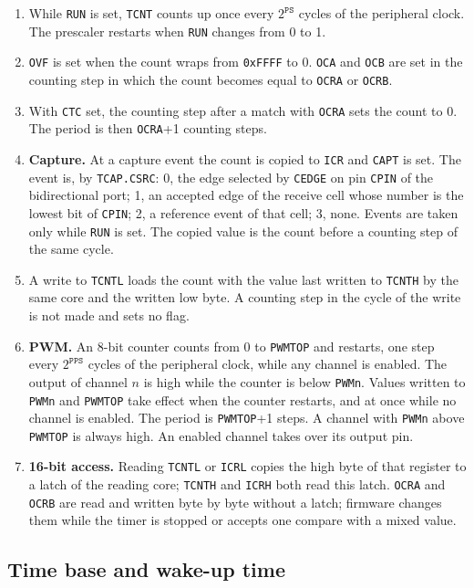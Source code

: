\documentclass[10pt,a4paper]{article}
\newcommand{\reg}[1]{\texttt{#1}}
\begin{document}
\begin{enumerate}[label=\textbf{B\arabic*},leftmargin=2.6em]
\item While \reg{RUN} is set, \reg{TCNT} counts up once every $2^{\mathtt{PS}}$ cycles of the peripheral clock. The
prescaler restarts when \reg{RUN} changes from 0 to 1.
\item \reg{OVF} is set when the count wraps from \texttt{0xFFFF} to 0. \reg{OCA} and \reg{OCB} are set in the
counting step in which the count becomes equal to \reg{OCRA} or \reg{OCRB}.
\item With \reg{CTC} set, the counting step after a match with \reg{OCRA} sets the count to 0. The period is then
\reg{OCRA}+1 counting steps.
\item \textbf{Capture.} At a capture event the count is copied to \reg{ICR} and \reg{CAPT} is set. The event is,
by \reg{TCAP.CSRC}: 0, the edge selected by \reg{CEDGE} on pin \reg{CPIN} of the bidirectional port; 1, an
accepted edge of the receive cell whose number is the lowest bit of \reg{CPIN}; 2, a reference event of that cell; 3, none.
Events are taken only while \reg{RUN} is set. The copied value is the count before a counting step of the same cycle.
\item A write to \reg{TCNTL} loads the count with the value last written to \reg{TCNTH} by the same core and the written low byte. A counting step in the cycle of the write is not made and sets no flag.
\item \textbf{PWM.} An 8-bit counter counts from 0 to \reg{PWMTOP} and restarts, one step every
$2^{\mathtt{PPS}}$ cycles of the peripheral clock, while any channel is enabled. The output of channel $n$ is
high while the counter is below \reg{PWMn}. Values written to \reg{PWMn} and \reg{PWMTOP} take effect when the
counter restarts, and at once while no channel is enabled. The period is \reg{PWMTOP}+1 steps. A channel
with \reg{PWMn} above \reg{PWMTOP} is always high. An enabled channel takes over its output pin.
\item \textbf{16-bit access.} Reading \reg{TCNTL} or \reg{ICRL} copies the high byte of that register to a latch of the reading core; \reg{TCNTH} and \reg{ICRH} both read this latch. \reg{OCRA} and \reg{OCRB} are read and written byte by byte without a latch; firmware changes them while the timer is stopped or accepts one compare with a mixed value.
\end{enumerate}

\subsection{Time base and wake-up time}
\end{document}
